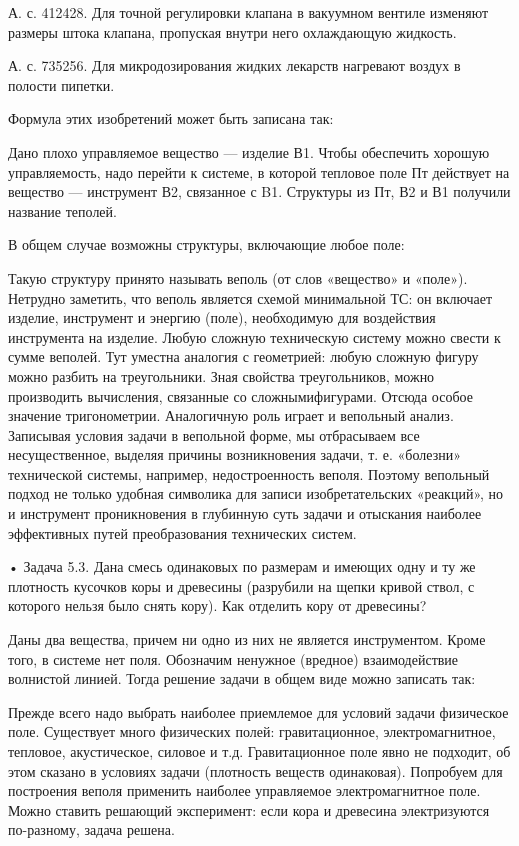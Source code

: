 А.  с. 412428.  Для  точной регулировки  клапана  в вакуумном  вентиле
изменяют  размеры штока  клапана,  пропуская  внутри него  охлаждающую
жидкость.

А. с. 735256. Для микродозирования  жидких лекарств нагревают воздух в
полости пипетки.

Формула этих изобретений может быть записана так:


Дано плохо управляемое вещество — изделие В1. Чтобы обеспечить хорошую
управляемость,  надо перейти  к системе,  в которой  тепловое поле  Пт
действует на  вещество — инструмент  В2, связанное с B1.  Структуры из
Пт, В2 и В1 получили название теполей.

В общем случае возможны структуры, включающие любое поле:


Такую  структуру  принято  называть   веполь  (от  слов  «вещество»  и
«поле»).  Нетрудно заметить,  что веполь  является схемой  минимальной
ТС:  он включает  изделие,  инструмент и  энергию (поле),  необходимую
для  воздействия инструмента  на  изделие.  Любую сложную  техническую
систему  можно  свести  к  сумме   веполей.  Тут  уместна  аналогия  с
геометрией: любую  сложную фигуру можно разбить  на треугольники. Зная
свойства  треугольников, можно  производить  вычисления, связанные  со
сложнымифигурами.  Отсюда особое  значение тригонометрии.  Аналогичную
роль   играет  и   вепольный  анализ.   Записывая  условия   задачи  в
вепольной форме,  мы отбрасываем  все несущественное,  выделяя причины
возникновения задачи,  т. е. «болезни» технической  системы, например,
недостроенность  веполя. Поэтому  вепольный подход  не только  удобная
символика  для  записи  изобретательских «реакций»,  но  и  инструмент
проникновения в глубинную суть задачи и отыскания наиболее эффективных
путей преобразования технических систем.

• Задача 5.3. Дана смесь одинаковых по размерам и имеющих одну и ту же
плотность кусочков коры и древесины  (разрубили на щепки кривой ствол,
с которого нельзя было снять кору). Как отделить кору от древесины?

Даны два  вещества, причем  ни одно из  них не  является инструментом.
Кроме  того,   в  системе  нет  поля.   Обозначим  ненужное  (вредное)
взаимодействие  волнистой линией.  Тогда решение  задачи в  общем виде
можно записать так:


Прежде   всего   надо   выбрать  наиболее   приемлемое   для   условий
задачи   физическое   поле.   Существует   много   физических   полей:
гравитационное,  электромагнитное, тепловое,  акустическое, силовое  и
т.д. Гравитационное поле явно не  подходит, об этом сказано в условиях
задачи (плотность веществ одинаковая). Попробуем для построения веполя
применить  наиболее управляемое  электромагнитное поле.  Можно ставить
решающий эксперимент: если кора  и древесина электризуются по-разному,
задача решена.

